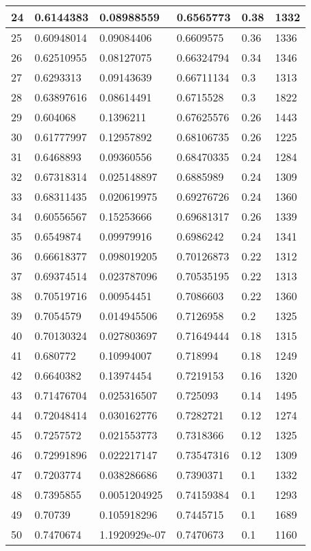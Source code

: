 \begin{longtable}{|l|l|l|l|l|l|}
24 & 0.6144383 & 0.08988559 & 0.6565773 & 0.38 & 1332 \\ \hline 
25 & 0.60948014 & 0.09084406 & 0.6609575 & 0.36 & 1336 \\ \hline 
26 & 0.62510955 & 0.08127075 & 0.66324794 & 0.34 & 1346 \\ \hline 
27 & 0.6293313 & 0.09143639 & 0.66711134 & 0.3 & 1313 \\ \hline 
28 & 0.63897616 & 0.08614491 & 0.6715528 & 0.3 & 1822 \\ \hline 
29 & 0.604068 & 0.1396211 & 0.67625576 & 0.26 & 1443 \\ \hline 
30 & 0.61777997 & 0.12957892 & 0.68106735 & 0.26 & 1225 \\ \hline 
31 & 0.6468893 & 0.09360556 & 0.68470335 & 0.24 & 1284 \\ \hline 
32 & 0.67318314 & 0.025148897 & 0.6885989 & 0.24 & 1309 \\ \hline 
33 & 0.68311435 & 0.020619975 & 0.69276726 & 0.24 & 1360 \\ \hline 
34 & 0.60556567 & 0.15253666 & 0.69681317 & 0.26 & 1339 \\ \hline 
35 & 0.6549874 & 0.09979916 & 0.6986242 & 0.24 & 1341 \\ \hline 
36 & 0.66618377 & 0.098019205 & 0.70126873 & 0.22 & 1312 \\ \hline 
37 & 0.69374514 & 0.023787096 & 0.70535195 & 0.22 & 1313 \\ \hline 
38 & 0.70519716 & 0.00954451 & 0.7086603 & 0.22 & 1360 \\ \hline 
39 & 0.7054579 & 0.014945506 & 0.7126958 & 0.2 & 1325 \\ \hline 
40 & 0.70130324 & 0.027803697 & 0.71649444 & 0.18 & 1315 \\ \hline 
41 & 0.680772 & 0.10994007 & 0.718994 & 0.18 & 1249 \\ \hline 
42 & 0.6640382 & 0.13974454 & 0.7219153 & 0.16 & 1320 \\ \hline 
43 & 0.71476704 & 0.025316507 & 0.725093 & 0.14 & 1495 \\ \hline 
44 & 0.72048414 & 0.030162776 & 0.7282721 & 0.12 & 1274 \\ \hline 
45 & 0.7257572 & 0.021553773 & 0.7318366 & 0.12 & 1325 \\ \hline 
46 & 0.72991896 & 0.022217147 & 0.73547316 & 0.12 & 1309 \\ \hline 
47 & 0.7203774 & 0.038286686 & 0.7390371 & 0.1 & 1332 \\ \hline 
48 & 0.7395855 & 0.0051204925 & 0.74159384 & 0.1 & 1293 \\ \hline 
49 & 0.70739 & 0.105918296 & 0.7445715 & 0.1 & 1689 \\ \hline 
50 & 0.7470674 & 1.1920929e-07 & 0.7470673 & 0.1 & 1160 \\ \hline 
\end{longtable}